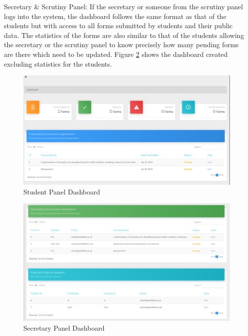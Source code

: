 \documentclass[../main.tex]{subfiles}
\begin{document}
Secretary \& Scrutiny Panel: If the secretary or someone from the scrutiny panel logs into the system, the dashboard follows the same format as that of the students but with access to all forms submitted by students and their public data. The statistics of the forms are also similar to that of the students allowing the secretary or the scrutiny panel to know precisely how many pending forms are there which need to be updated. Figure \ref{fig:secretarydashimplement} shows the dashboard created excluding statistics for the students.

\begin{figure}[H]
        \includegraphics[scale=0.7]
        {images/dashboardimplement.png}
        \caption{\label{fig:dashboardimplement} Student Panel Dashboard}
      \end{figure}

\begin{figure}[H]
        \includegraphics[scale=0.7]
        {images/secretarydashimplement.png}
        \caption{\label{fig:secretarydashimplement} Secretary Panel Dashboard}
      \end{figure}
\end{document}
